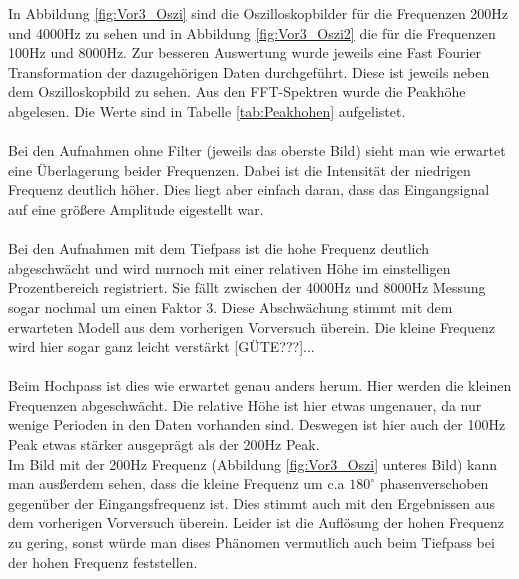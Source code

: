 \documentclass[12pt,a4paper]{article}
\begin{document}
In Abbildung \ref{fig:Vor3_Oszi} sind die Oszilloskopbilder für die Frequenzen 200Hz und 4000Hz zu sehen und in Abbildung \ref{fig:Vor3_Oszi2} die für die Frequenzen 100Hz und 8000Hz. Zur besseren Auswertung wurde jeweils eine Fast Fourier Transformation der dazugehörigen Daten durchgeführt. Diese ist jeweils neben dem Oszilloskopbild zu sehen. Aus den FFT-Spektren wurde die Peakhöhe abgelesen. Die Werte sind in Tabelle \ref{tab:Peakhohen} aufgelistet.\\
\\
Bei den Aufnahmen ohne Filter (jeweils das oberste Bild) sieht man wie erwartet eine Überlagerung beider Frequenzen. Dabei ist die Intensität der niedrigen Frequenz deutlich höher. Dies liegt aber einfach daran, dass das Eingangsignal auf eine größere Amplitude eigestellt war.\\
\\
Bei den Aufnahmen mit dem Tiefpass ist die hohe Frequenz deutlich abgeschwächt und wird nurnoch mit einer relativen Höhe im einstelligen Prozentbereich registriert. Sie fällt zwischen der 4000Hz und 8000Hz Messung sogar nochmal um einen Faktor 3. Diese Abschwächung stimmt mit dem erwarteten Modell aus dem vorherigen Vorversuch überein. Die kleine Frequenz wird hier sogar ganz leicht verstärkt [GÜTE???]...\\
\\
Beim Hochpass ist dies wie erwartet genau anders herum. Hier werden die kleinen Frequenzen abgeschwächt. Die relative Höhe ist hier etwas ungenauer, da nur wenige Perioden in den Daten vorhanden sind. Deswegen ist hier auch der 100Hz Peak etwas stärker ausgeprägt als der 200Hz Peak.\\
Im Bild mit der 200Hz Frequenz (Abbildung \ref{fig:Vor3_Oszi} unteres Bild) kann man ausßerdem sehen, dass die kleine Frequenz um c.a $180^\circ$ phasenverschoben gegenüber der Eingangsfrequenz ist. Dies stimmt auch mit den Ergebnissen aus dem vorherigen Vorversuch überein. Leider ist die Auflösung der hohen Frequenz zu gering, sonst würde man dises Phänomen vermutlich auch beim Tiefpass bei der hohen Frequenz feststellen. 
\end{document}
